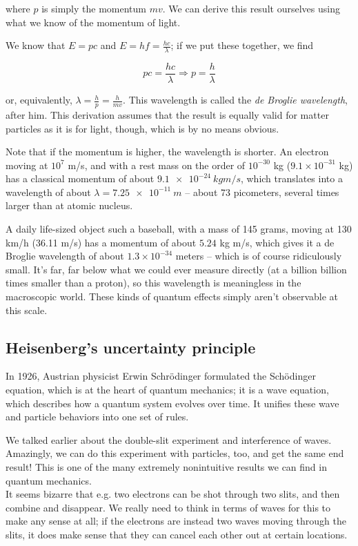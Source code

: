 \documentclass[8.01x]{subfiles}
\begin{document}
where $p$ is simply the momentum $m v$. We can derive this result ourselves using what we know of the momentum of light.

We know that $E = p c$ and $\displaystyle E = h f = \frac{h c}{\lambda}$; if we put these together, we find

\begin{equation}
p c = \frac{h c}{\lambda} \Rightarrow  p = \frac{h}{\lambda}
\end{equation}

or, equivalently, $\displaystyle \lambda = \frac{h}{p} = \frac{h}{m v}$. This wavelength is called the \emph{de Broglie wavelength}, after him. This derivation assumes that the result is equally valid for matter particles as it is for light, though, which is by no means obvious.

Note that if the momentum is higher, the wavelength is shorter. An electron moving at $10^7$ m/s, and with a rest mass on the order of $10^{-30}$ kg ($9.1\times 10^{-31}$ kg) has a classical momentum of about $\SI{9.1e-24}{kg m/s}$, which translates into a wavelength of about $\lambda = \SI{7.25e-11}{m}$ -- about 73 picometers, several times larger than at atomic nucleus.

A daily life-sized object such a baseball, with a mass of 145 grams, moving at 130 km/h (36.11 m/s) has a momentum of about $5.24$ kg m/s, which gives it a de Broglie wavelength of about $1.3 \times 10^{-34}$ meters -- which is of course ridiculously small. It's far, far below what we could ever measure directly (at a billion billion times smaller than a proton), so this wavelength is meaningless in the macroscopic world. These kinds of quantum effects simply aren't observable at this scale.

\subsection{Heisenberg's uncertainty principle}

In 1926, Austrian physicist Erwin Schr\"odinger formulated the Sch\"odinger equation, which is at the heart of quantum mechanics; it is a wave equation, which describes how a quantum system evolves over time. It unifies these wave and particle behaviors into one set of rules.

We talked earlier about the double-slit experiment and interference of waves. Amazingly, we can do this experiment with particles, too, and get the same end result! This is one of the many extremely nonintuitive results we can find in quantum mechanics.\\
It seems bizarre that e.g. two electrons can be shot through two slits, and then combine and disappear. We really need to think in terms of waves for this to make any sense at all; if the electrons are instead two waves moving through the slits, it does make sense that they can cancel each other out at certain locations.
\end{document}
